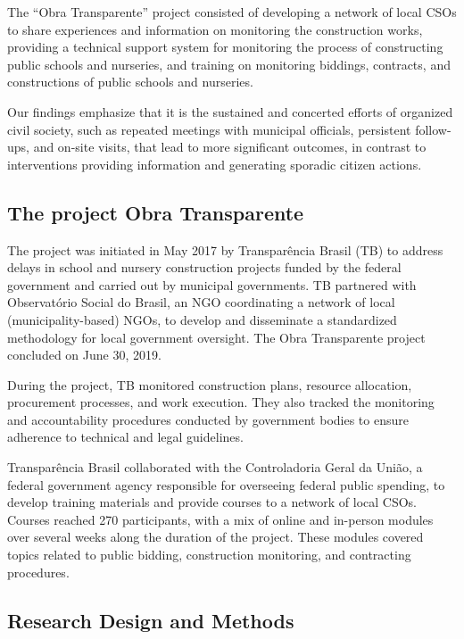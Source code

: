 \documentclass[]{AEA}
\begin{document}
The ``Obra Transparente'' project consisted of developing a network of
local CSOs to share experiences and information on monitoring the
construction works, providing a technical support system for monitoring
the process of constructing public schools and nurseries, and training
on monitoring biddings, contracts, and constructions of public schools
and nurseries.

Our findings emphasize that it is the sustained and concerted efforts of
organized civil society, such as repeated meetings with municipal
officials, persistent follow-ups, and on-site visits, that lead to more
significant outcomes, in contrast to interventions providing information
and generating sporadic citizen actions.

\hypertarget{the-project-obra-transparente}{%
\subsection{The project Obra
Transparente}\label{the-project-obra-transparente}}

The project was initiated in May 2017 by Transparência Brasil (TB) to
address delays in school and nursery construction projects funded by the
federal government and carried out by municipal governments. TB
partnered with Observatório Social do Brasil, an NGO coordinating a
network of local (municipality-based) NGOs, to develop and disseminate a
standardized methodology for local government oversight. The Obra
Transparente project concluded on June 30, 2019.

During the project, TB monitored construction plans, resource
allocation, procurement processes, and work execution. They also tracked
the monitoring and accountability procedures conducted by government
bodies to ensure adherence to technical and legal guidelines.

Transparência Brasil collaborated with the Controladoria Geral da União,
a federal government agency responsible for overseeing federal public
spending, to develop training materials and provide courses to a network
of local CSOs. Courses reached 270 participants, with a mix of online
and in-person modules over several weeks along the duration of the
project. These modules covered topics related to public bidding,
construction monitoring, and contracting procedures.

\hypertarget{research-design-and-methods}{%
\subsection{Research Design and
Methods}\label{research-design-and-methods}}
\end{document}
